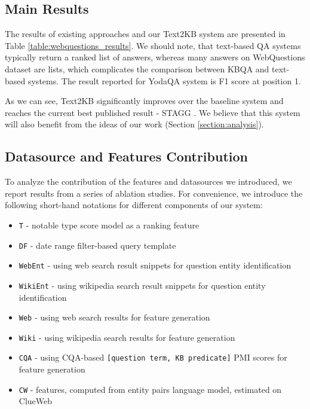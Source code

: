 \subsection{Main Results}
\label{sec:results}
The results of existing approaches and our Text2KB system are presented in Table \ref{table:webquestions_results}.
We should note, that text-based QA systems typically return a ranked list of answers, whereas many answers on WebQuestions dataset are lists, which complicates the comparison between KBQA and text-based systems.
The result reported for YodaQA system is F1 score at position 1.


As we can see, Text2KB significantly improves over the baseline system and reaches the current best published result - STAGG \cite{yih2015semantic}. 
We believe that this system will also benefit from the ideas of our work (Section \ref{section:analysis}).

\subsection{Datasource and Features Contribution}
\label{section:eval:ablation}

To analyze the contribution of the features and datasources we introduced, we report results from a series of ablation studies. For convenience, we introduce the following short-hand notations for different components of our system:

\begin{itemize}[noitemsep,topsep=0pt]
\item \texttt{T} - notable type score model as a ranking feature
\item \texttt{DF} - date range filter-based query template
\item \texttt{WebEnt} - using web search result snippets for question entity identification
\item \texttt{WikiEnt} - using wikipedia search result snippets for question entity identification
\item \texttt{Web} - using web search results for feature generation
\item \texttt{Wiki} - using wikipedia search results for feature generation
\item \texttt{CQA} - using CQA-based \texttt{[question term, KB predicate]} PMI scores for feature generation
\item \texttt{CW} - features, computed from entity pairs language model, estimated on ClueWeb
\end{itemize}

